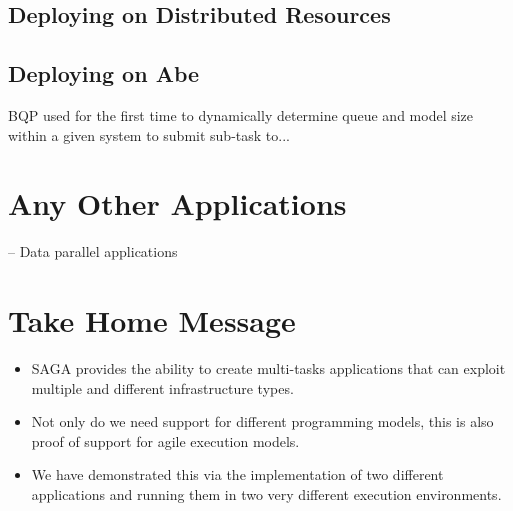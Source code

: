 \documentclass[conference,final]{IEEEtran}
\begin{document}
\subsection{Deploying on Distributed Resources}

\subsection{Deploying on Abe}

BQP used for the first time to dynamically determine queue and model
size within a given system to submit sub-task to...


\section{Any Other Applications}

 -- Data parallel applications

\section{Take Home Message}

\begin{itemize}
\item  SAGA provides the ability to create multi-tasks applications that
  can exploit multiple and different infrastructure types.

\item Not only do we need support for different programming models, 
this is also proof of support for agile execution models.

\item We have demonstrated this via the implementation of two
  different applications and running them in two very different
  execution environments.
\end{itemize}







  
  
\end{document}
